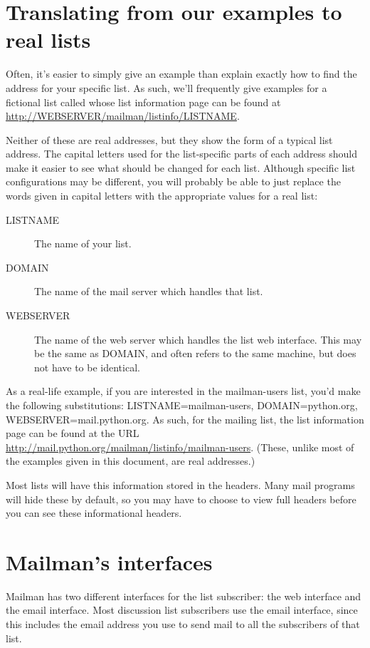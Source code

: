 \documentclass{howto}
\begin{document}
\section{Translating from our examples to real lists}

Often, it's easier to simply give an example than explain exactly how
to find the address for your specific list.  As such, we'll frequently 
give examples for a fictional list called 
 whose list information page can be found at
\url{http://WEBSERVER/mailman/listinfo/LISTNAME}.  

Neither of these are
real addresses, but they show the form of a typical list address.
The capital letters used for the list-specific parts of each address should 
make it easier to see what should be changed for each
list. Although specific list configurations may be different, you will
probably be able to just replace the words given in capital letters with the
appropriate values for a real list:

\begin{description}
	\item [LISTNAME] The name of your list.
	\item [DOMAIN] The name of the mail server which handles that list. 
	\item [WEBSERVER] The name of the web server which handles the list web interface.  This may be the same as DOMAIN, and often refers to the same machine, but does not have to be identical. 
\end{description}

As a real-life example, if you are interested in the mailman-users list, you'd 
make the following substitutions: LISTNAME=mailman-users, DOMAIN=python.org, WEBSERVER=mail.python.org.  As such, for the 
mailing list, the list information page can be found at the URL
\url{http://mail.python.org/mailman/listinfo/mailman-users}.  (These, unlike 
most of the examples given in this document, are real addresses.)

Most lists will have this information stored in the  
headers.  Many
mail programs will hide these by default, so you may have to choose to view
full headers before you can see these informational headers.  

\section{Mailman's interfaces}
Mailman has two different interfaces for the list subscriber: the web 
interface and the email interface.  Most discussion list subscribers use 
the email interface, since this includes the email address you use to send 
mail to all the subscribers of that list.
\end{document}

